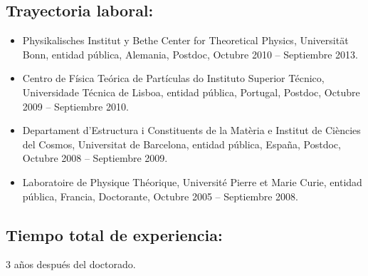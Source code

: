 \subsection{Trayectoria laboral:}
\begin{itemize}
\item Physikalisches Institut y Bethe Center for Theoretical Physics, Universität Bonn, entidad pública, Alemania, Postdoc, Octubre 2010 -- Septiembre 2013.
\item Centro de Física Teórica de Partículas do Instituto Superior Técnico, Universidade Técnica de Lisboa, entidad pública, Portugal, Postdoc, Octubre 2009 -- Septiembre 2010.
\item Departament d'Estructura i Constituents de la Matèria e Institut de Ciències del Cosmos, Universitat de Barcelona, entidad pública, España, Postdoc, Octubre 2008 -- Septiembre 2009.
\item Laboratoire de Physique Théorique, Université Pierre et Marie Curie, entidad pública, Francia, Doctorante, Octubre 2005 -- Septiembre 2008.
\end{itemize}
\subsection{Tiempo total de experiencia:}
3 años después del doctorado.


